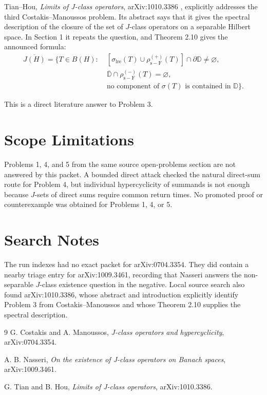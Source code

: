 \documentclass[11pt]{article}
\begin{document}
Tian--Hou, \emph{Limits of J-class operators}, arXiv:1010.3386 \cite{TH},
explicitly addresses the third Costakis--Manoussos problem.  Its abstract says
that it gives the spectral description of the closure of the set of
\(J\)-class operators on a separable Hilbert space.  In Section 1 it repeats the
question, and Theorem 2.10 gives the announced formula:
\[
\begin{aligned}
\overline{J(H)}=\{T\in B(H):\;&
[\sigma_{\mathrm{lre}}(T)\cup\rho^{(+)}_{\mathrm{s-F}}(T)]
      \cap\partial\mathbb D\neq\varnothing,\\
&\overline{\mathbb D}\cap\rho^{(-)}_{\mathrm{s-F}}(T)=\varnothing,\\
&\text{no component of }\sigma(T)\text{ is contained in }\mathbb D\}.
\end{aligned}
\]

This is a direct literature answer to Problem 3.

\section*{Scope Limitations}

Problems 1, 4, and 5 from the same source open-problems section are not answered
by this packet.  A bounded direct attack checked the natural direct-sum route for
Problem 4, but individual hypercyclicity of summands is not enough because
\(J\)-sets of direct sums require common return times.  No promoted proof or
counterexample was obtained for Problems 1, 4, or 5.

\section*{Search Notes}

The run indexes had no exact packet for arXiv:0704.3354.  They did contain a
nearby triage entry for arXiv:1009.3461, recording that Nasseri answers the
non-separable \(J\)-class existence question in the negative.  Local source search
also found arXiv:1010.3386, whose abstract and introduction explicitly identify
Problem 3 from Costakis--Manoussos and whose Theorem 2.10 supplies the spectral
description.

\begin{thebibliography}{9}
G. Costakis and A. Manoussos, \emph{J-class operators and hypercyclicity},
arXiv:0704.3354.

A. B. Nasseri, \emph{On the existence of J-class operators on Banach spaces},
arXiv:1009.3461.

G. Tian and B. Hou, \emph{Limits of J-class operators}, arXiv:1010.3386.
\end{thebibliography}
\end{document}
